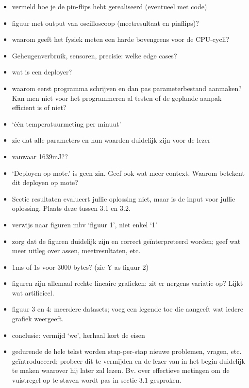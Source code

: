 \documentclass[11pt]{article}
\begin{document}
\begin{itemize}
\item vermeld hoe je de pin-flips hebt gerealiseerd (eventueel met code)
\item figuur met output van oscilloscoop (meetresultaat en pinflips)?
\item waarom geeft het fysiek meten een harde bovengrens voor de CPU-cycli?
\item Geheugenverbruik, sensoren, precisie: welke edge cases?
\item wat is een deployer?
\item waarom eerst programma schrijven en dan pas parameterbestand aanmaken? Kan men niet voor het programmeren al testen of de geplande aanpak efficient is of niet?
\item ‘één temperatuurmeting per minuut’
\item zie dat alle parameters en hun waarden duidelijk zijn voor de lezer
\item vanwaar 1639mJ??
\item ‘Deployen op mote.’ is geen zin. Geef ook wat meer context. Waarom betekent dit deployen op mote?
\item Sectie resultaten evalueert jullie oplossing niet, maar is de input voor jullie oplossing. Plaats deze tussen 3.1 en 3.2.
\item verwijs naar figuren mbv ‘figuur 1’, niet enkel ‘1’
\item zorg dat de figuren duidelijk zijn en correct geïnterpreteerd worden; geef wat meer uitleg over assen, meetresultaten, etc.
\item 1ms of 1s voor 3000 bytes? (zie Y-as figuur 2)
\item figuren zijn allemaal rechte lineaire grafieken: zit er nergens variatie op? Lijkt wat artificieel. 
\item figuur 3 en 4: meerdere datasets; voeg een legende toe die aangeeft wat iedere grafiek weergeeft.
\item conclusie: vermijd ‘we’, herhaal kort de eisen

\item gedurende de hele tekst worden stap-per-stap nieuwe problemen, vragen, etc. geïntroduceerd; probeer dit te vermijden en de lezer van in het begin duidelijk te maken waarover hij later zal lezen. Bv. over effectieve metingen om de vuistregel op te staven wordt pas in sectie 3.1 gesproken.
\end{itemize}
\end{document}
